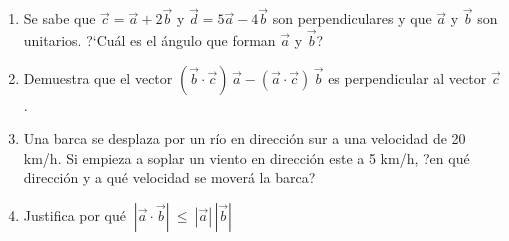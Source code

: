 \begin{enumerate}
\item	Se sabe que $\vec c = \vec a + 2\vec b$ y $\vec d = 5\vec a - 4\vec b$ son perpendiculares y que $\vec a$ y $\vec b$ son unitarios. ?`Cuál es el ángulo que forman $\vec a$ y $\vec b$?

\vspace{-6mm}
\begin{flushright}
\begin{footnotesize} \textcolor{gris}{}	\end{footnotesize}
\end{flushright}

\item	Demuestra que el vector $(\vec b \cdot \vec c) \, \vec a - (\vec a \cdot \vec c)\, \vec b$ es perpendicular al vector $\vec c$.

\vspace{-6mm}
\begin{flushright}
\begin{footnotesize} \textcolor{gris}{}	\end{footnotesize}
\end{flushright}

\item	Una barca se desplaza por un río en dirección sur a una velocidad de 20 km/h. Si empieza a soplar un viento en dirección este a 5 km/h, ?en qué dirección y a qué velocidad se moverá la barca?

\vspace{-6mm}
\begin{flushright}
\begin{footnotesize} \textcolor{gris}{}	\end{footnotesize}
\end{flushright}


\item	Justifica por qué $\ |\vec  a \cdot \vec b | \ \leqslant \  | \vec a | \,  | \vec b |$

\vspace{-6mm}
\begin{flushright}
\begin{footnotesize} \textcolor{gris}{}	\end{footnotesize}
\end{flushright}



\end{enumerate}






